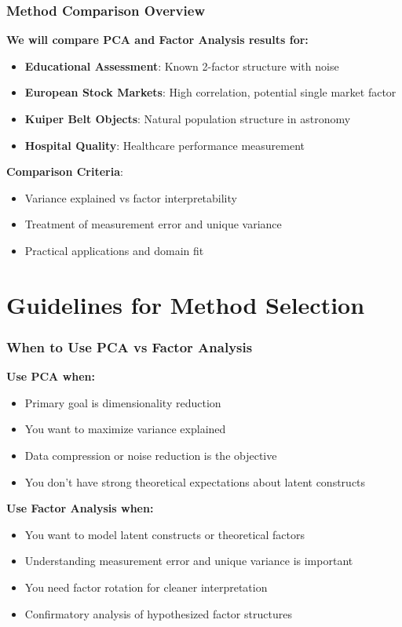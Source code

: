 \documentclass[aspectratio=169]{beamer}
\begin{document}
\begin{frame}
    \frametitle{Method Comparison Overview}
    \textbf{We will compare PCA and Factor Analysis results for:}
    \begin{itemize}
        \item \textbf{Educational Assessment}: Known 2-factor structure with noise
        \item \textbf{European Stock Markets}: High correlation, potential single market factor  
        \item \textbf{Kuiper Belt Objects}: Natural population structure in astronomy
        \item \textbf{Hospital Quality}: Healthcare performance measurement
    \end{itemize}
    \vspace{12pt}
    \textbf{Comparison Criteria}:
    \begin{itemize}
        \item Variance explained vs factor interpretability
        \item Treatment of measurement error and unique variance
        \item Practical applications and domain fit
    \end{itemize}
\end{frame}

\section{Guidelines for Method Selection}

\begin{frame}
    \frametitle{When to Use PCA vs Factor Analysis}
    \textbf{Use PCA when:}
    \begin{itemize}
        \item Primary goal is dimensionality reduction \pause
        \item You want to maximize variance explained \pause
        \item Data compression or noise reduction is the objective \pause
        \item You don't have strong theoretical expectations about latent constructs \pause
    \end{itemize}
    \vspace{12pt}
    \textbf{Use Factor Analysis when:}
    \begin{itemize}
        \item You want to model latent constructs or theoretical factors \pause
        \item Understanding measurement error and unique variance is important \pause
        \item You need factor rotation for cleaner interpretation \pause
        \item Confirmatory analysis of hypothesized factor structures \pause
    \end{itemize}
\end{frame}
\end{document}
